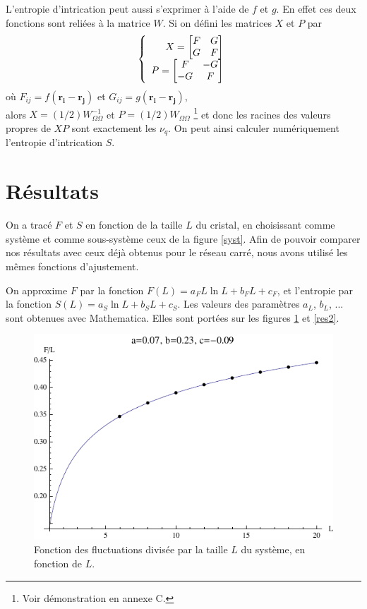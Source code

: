 \documentclass[a4paper, french]{report}
\newcommand{\pos}[1]{\ensuremath{\mathbf{r_{#1}}}\xspace}
\newcommand{\om}{\ensuremath{\Omega}\xspace}
\newcommand{\1}{\ensuremath{\ket{\om_1\bom_1}}\xspace}
\newcommand{\2}{\ensuremath{\ket{\om_2\bom_2}}\xspace}
\begin{document}
L'entropie d'intrication peut aussi s'exprimer à l'aide de $f$ et $g$. En effet ces deux fonctions sont reliées à la matrice $W$. Si on défini les matrices $X$ et $P$ par 
\begin{equation}
\label{eq:XP}
\left\{
	\begin{array}{r c l}
		X=
		\begin{bmatrix}
		F & G\\
		G & F\\
		\end{bmatrix}\\
		P=
		\begin{bmatrix}
		F & -G\\
		-G & F\\
		\end{bmatrix}
	\end{array}
\right.
\end{equation}
où $F_{ij}=f(\pos{i}-\pos{j})$ et $G_{ij}=g(\pos{i}-\pos{j})$,\\
alors $X=(1/2)W^{-1}_{\om\om}$ et $P=(1/2)W_{\om\om}$ \footnote{Voir démonstration en annexe C.} et donc les racines des valeurs propres de $XP$ sont exactement les $\nu_q$. On peut ainsi calculer numériquement l'entropie d'intrication $S$.
\section{Résultats}
\label{sec:res}
On a tracé $F$ et $S$ en fonction de la taille $L$ du cristal, en choisissant comme système et comme sous-système ceux de la figure \ref{syst}. Afin de pouvoir comparer nos résultats avec ceux déjà obtenus pour le réseau carré, nous avons utilisé les mêmes fonctions d'ajustement.

On approxime $F$ par la fonction $F(L)=a_FL \ln L +b_FL+c_F$, et l'entropie par la fonction $S(L)=a_S\ln L +b_SL+c_S$. Les valeurs des paramètres $a_L$, $b_L$, ... sont obtenues avec Mathematica. Elles sont portées sur les figures \ref{res1} et \ref{res2}. 

\begin{figure}[htp]
\centering
\includegraphics[scale=1.00]{vector_img/fluct.pdf}
\caption{Fonction des fluctuations divisée par la taille $L$ du système, en fonction de $L$.}
\label{res1}
\end{figure}
\end{document}
